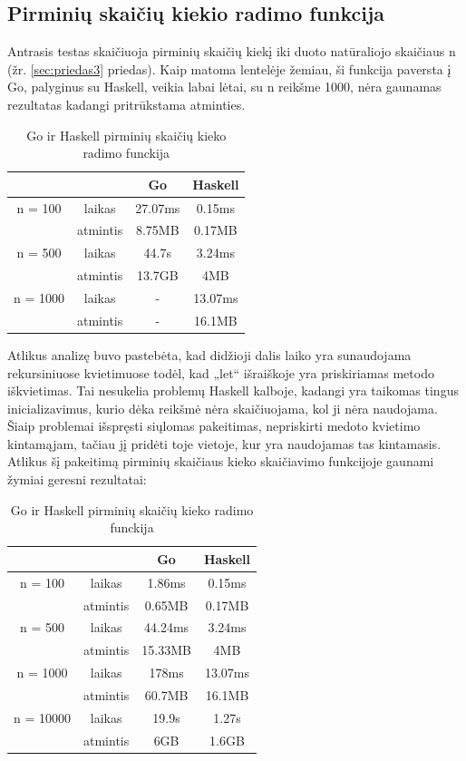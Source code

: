 \documentclass{VUMIFPSkursinis}
\begin{document}
	\subsection{Pirminių skaičių kiekio radimo funkcija}
	 Antrasis testas skaičiuoja pirminių skaičių kiekį iki duoto natūraliojo skaičiaus n (žr. \ref{sec:priedas3} priedas). Kaip matoma lentelėje žemiau, ši funkcija paversta į Go, palyginus su Haskell, veikia labai lėtai, su n reikšme 1000, nėra gaunamas rezultatas kadangi pritrūkstama atminties.
	\begin{center}
		\centering
		\begin{table}[h]
			\caption{Go ir Haskell pirminių skaičių kieko radimo funckija}
			\centering
		\begin{tabular}{ cccc } 
		& & \textbf{Go} & \textbf{Haskell}  \\
		\midrule
		n = 100 & laikas & 27.07ms & 0.15ms    \\
		& atmintis & 8.75MB & 0.17MB \\
		\midrule
		n = 500 & laikas & 44.7s & 3.24ms  \\
		& atmintis & 13.7GB & 4MB \\
		\midrule
		n = 1000 & laikas & - & 13.07ms  \\
		& atmintis & - & 16.1MB \\
		\end{tabular}
		\centering
	\end{table}
		\end{center}
		Atlikus analizę buvo pastebėta, kad didžioji dalis laiko yra sunaudojama rekursiniuose kvietimuose todėl, kad „let“ išraiškoje yra priskiriamas metodo iškvietimas. Tai nesukelia problemų Haskell kalboje, kadangi  yra taikomas tingus inicializavimus, kurio dėka reikšmė nėra skaičiuojama, kol ji nėra naudojama. Šiaip problemai išspręsti siųlomas pakeitimas, nepriskirti medoto kvietimo kintamąjam, tačiau jį pridėti toje vietoje, kur yra naudojamas tas kintamasis. Atlikus šį pakeitimą pirminių skaičiaus kieko skaičiavimo funkcijoje gaunami žymiai geresni rezultatai:
		\begin{center}
			\centering
			\begin{table}[h]
				\caption{Go ir Haskell pirminių skaičių kieko radimo funckija}
				\centering
			\begin{tabular}{ cccc } 
			& & \textbf{Go} & \textbf{Haskell}  \\
			\midrule
			n = 100 & laikas & 1.86ms & 0.15ms    \\
			& atmintis & 0.65MB & 0.17MB \\
			\midrule
			n = 500 & laikas & 44.24ms & 3.24ms  \\
			& atmintis & 15.33MB & 4MB \\
			\midrule
			n = 1000 & laikas & 178ms & 13.07ms  \\
			& atmintis & 60.7MB & 16.1MB \\
			\midrule
			n = 10000 & laikas & 19.9s & 1.27s  \\
			& atmintis & 6GB & 1.6GB \\
			\end{tabular}
			\centering
		\end{table}
			\end{center}
\end{document}
